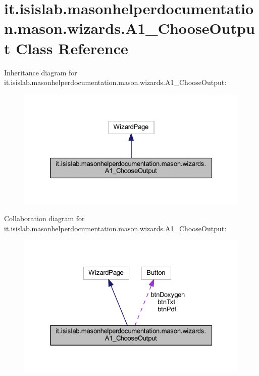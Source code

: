 \hypertarget{classit_1_1isislab_1_1masonhelperdocumentation_1_1mason_1_1wizards_1_1_a1___choose_output}{\section{it.\-isislab.\-masonhelperdocumentation.\-mason.\-wizards.\-A1\-\_\-\-Choose\-Output Class Reference}
\label{classit_1_1isislab_1_1masonhelperdocumentation_1_1mason_1_1wizards_1_1_a1___choose_output}
}


Inheritance diagram for it.\-isislab.\-masonhelperdocumentation.\-mason.\-wizards.\-A1\-\_\-\-Choose\-Output\-:
\nopagebreak
\begin{figure}[H]
\begin{center}
\leavevmode
\includegraphics[width=326pt]{classit_1_1isislab_1_1masonhelperdocumentation_1_1mason_1_1wizards_1_1_a1___choose_output__inherit__graph}
\end{center}
\end{figure}


Collaboration diagram for it.\-isislab.\-masonhelperdocumentation.\-mason.\-wizards.\-A1\-\_\-\-Choose\-Output\-:
\nopagebreak
\begin{figure}[H]
\begin{center}
\leavevmode
\includegraphics[width=326pt]{classit_1_1isislab_1_1masonhelperdocumentation_1_1mason_1_1wizards_1_1_a1___choose_output__coll__graph}
\end{center}
\end{figure}
